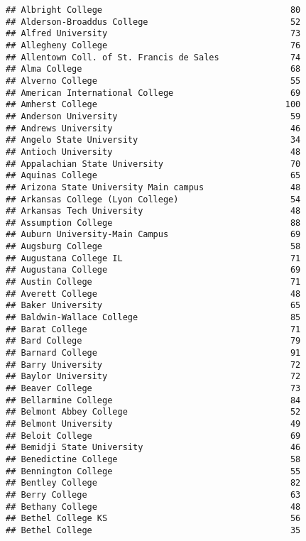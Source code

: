 \documentclass[
]{article}
\begin{document}
\begin{verbatim}
## Albright College                                     80
## Alderson-Broaddus College                            52
## Alfred University                                    73
## Allegheny College                                    76
## Allentown Coll. of St. Francis de Sales              74
## Alma College                                         68
## Alverno College                                      55
## American International College                       69
## Amherst College                                     100
## Anderson University                                  59
## Andrews University                                   46
## Angelo State University                              34
## Antioch University                                   48
## Appalachian State University                         70
## Aquinas College                                      65
## Arizona State University Main campus                 48
## Arkansas College (Lyon College)                      54
## Arkansas Tech University                             48
## Assumption College                                   88
## Auburn University-Main Campus                        69
## Augsburg College                                     58
## Augustana College IL                                 71
## Augustana College                                    69
## Austin College                                       71
## Averett College                                      48
## Baker University                                     65
## Baldwin-Wallace College                              85
## Barat College                                        71
## Bard College                                         79
## Barnard College                                      91
## Barry University                                     72
## Baylor University                                    72
## Beaver College                                       73
## Bellarmine College                                   84
## Belmont Abbey College                                52
## Belmont University                                   49
## Beloit College                                       69
## Bemidji State University                             46
## Benedictine College                                  58
## Bennington College                                   55
## Bentley College                                      82
## Berry College                                        63
## Bethany College                                      48
## Bethel College KS                                    56
## Bethel College                                       35

\end{verbatim}
\end{document}

